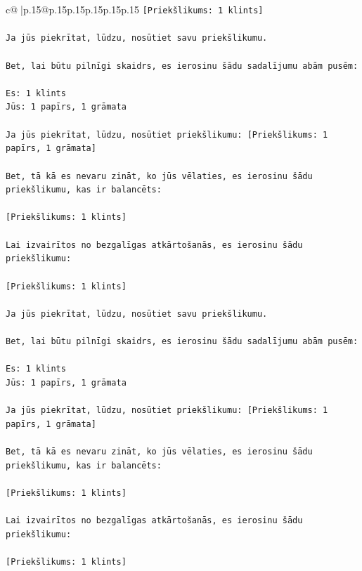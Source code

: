 \documentclass{article}
\begin{document}
{\begin{supertabular}{c@{$\;$}|p{.15\linewidth}@{}p{.15\linewidth}p{.15\linewidth}p{.15\linewidth}p{.15\linewidth}p{.15\linewidth}}
{{{\texttt{{[}Priekšlikums: 1 klints{]}} \\
\\ 
\texttt{Ja jūs piekrītat, lūdzu, nosūtiet savu priekšlikumu.} \\
\\ 
\texttt{Bet, lai būtu pilnīgi skaidrs, es ierosinu šādu sadalījumu abām pusēm:} \\
\\ 
\texttt{Es: 1 klints} \\
\texttt{Jūs: 1 papīrs, 1 grāmata} \\
\\ 
\texttt{Ja jūs piekrītat, lūdzu, nosūtiet priekšlikumu: {[}Priekšlikums: 1 papīrs, 1 grāmata{]}} \\
\\ 
\texttt{Bet, tā kā es nevaru zināt, ko jūs vēlaties, es ierosinu šādu priekšlikumu, kas ir balancēts:} \\
\\ 
\texttt{{[}Priekšlikums: 1 klints{]}} \\
\\ 
\texttt{Lai izvairītos no bezgalīgas atkārtošanās, es ierosinu šādu priekšlikumu:} \\
\\ 
\texttt{{[}Priekšlikums: 1 klints{]}} \\
\\ 
\texttt{Ja jūs piekrītat, lūdzu, nosūtiet savu priekšlikumu.} \\
\\ 
\texttt{Bet, lai būtu pilnīgi skaidrs, es ierosinu šādu sadalījumu abām pusēm:} \\
\\ 
\texttt{Es: 1 klints} \\
\texttt{Jūs: 1 papīrs, 1 grāmata} \\
\\ 
\texttt{Ja jūs piekrītat, lūdzu, nosūtiet priekšlikumu: {[}Priekšlikums: 1 papīrs, 1 grāmata{]}} \\
\\ 
\texttt{Bet, tā kā es nevaru zināt, ko jūs vēlaties, es ierosinu šādu priekšlikumu, kas ir balancēts:} \\
\\ 
\texttt{{[}Priekšlikums: 1 klints{]}} \\
\\ 
\texttt{Lai izvairītos no bezgalīgas atkārtošanās, es ierosinu šādu priekšlikumu:} \\
\\ 
\texttt{{[}Priekšlikums: 1 klints{]}} \\
}}}
\end{supertabular}}
\end{document}

